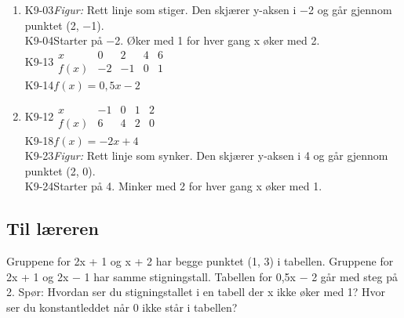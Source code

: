\documentclass[11pt,a4paper]{article}
\begin{document}
\begin{enumerate}[leftmargin=1.6em, itemsep=0.7em]
\item \begin{minipage}[t]{\linewidth}\textsf{\small K9-03}\quad \emph{Figur:} Rett linje som stiger. Den skjærer y-aksen i −2 og går gjennom punktet (2, −1). \\ \textsf{\small K9-04}\quad Starter på −2. Øker med 1 for hver gang x øker med 2. \\ \textsf{\small K9-13}\quad $\begin{array}{c|cccc} x & 0 & 2 & 4 & 6 \\ \hline f(x) & -2 & -1 & 0 & 1 \end{array}$ \\ \textsf{\small K9-14}\quad $f(x) = 0{,}5x - 2$\end{minipage}
\item \begin{minipage}[t]{\linewidth}\textsf{\small K9-12}\quad $\begin{array}{c|cccc} x & -1 & 0 & 1 & 2 \\ \hline f(x) & 6 & 4 & 2 & 0 \end{array}$ \\ \textsf{\small K9-18}\quad $f(x) = -2x + 4$ \\ \textsf{\small K9-23}\quad \emph{Figur:} Rett linje som synker. Den skjærer y-aksen i 4 og går gjennom punktet (2, 0). \\ \textsf{\small K9-24}\quad Starter på 4. Minker med 2 for hver gang x øker med 1.\end{minipage}
\end{enumerate}
\subsection*{Til læreren}
Gruppene for 2x + 1 og x + 2 har begge punktet (1, 3) i tabellen. Gruppene for 2x + 1 og 2x − 1 har samme stigningstall. Tabellen for 0,5x − 2 går med steg på 2. Spør: Hvordan ser du stigningstallet i en tabell der x ikke øker med 1? Hvor ser du konstantleddet når 0 ikke står i tabellen?
\end{document}
